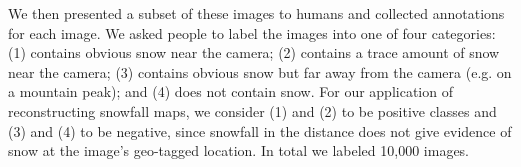 We then presented a subset of these images to humans and collected
annotations for each image. We asked people to label
the images into one of four categories: (1) contains obvious
snow near the camera; (2) contains a trace amount of snow near
the camera; (3) contains obvious snow but far away from the
camera (e.g. on a mountain peak); and (4) does not contain snow. 
For our application of reconstructing snowfall maps, we consider (1)
and (2) to be positive classes and (3) and (4) to be negative,
since snowfall in the distance does not give evidence of snow
at the image's geo-tagged location. In total we labeled 10,000 images.
